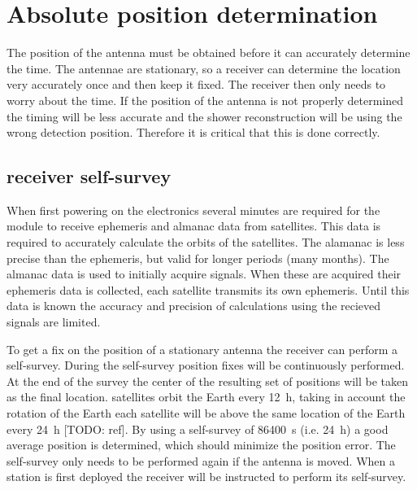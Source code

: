 \section{Absolute position determination}

The position of the \gps antenna must be obtained before it can accurately determine the time. The \gps antennae are stationary, so a \gps receiver can determine the location very accurately once and then keep it fixed. The \gps receiver then only needs to worry about the time. If the position of the \gps antenna is not properly determined the timing will be less accurate and the shower reconstruction will be using the wrong detection position. Therefore it is critical that this is done correctly.


\subsection{\gps receiver self-survey}

When first powering on the electronics several minutes are required for the \gps module to receive ephemeris and almanac data from \gps satellites. This data is required to accurately calculate the orbits of the \gps satellites. The alamanac is less precise than the ephemeris, but valid for longer periods (many months). The almanac data is used to initially acquire \gps signals. When these are acquired their ephemeris data is collected, each \gps satellite transmits its own ephemeris. Until this data is known the accuracy and precision of calculations using the recieved signals are limited.

To get a fix on the position of a stationary \gps antenna the \gps receiver can perform a self-survey. During the self-survey position fixes will be continuously performed. At the end of the survey the center of the resulting set of positions will be taken as the final location. \gps satellites orbit the Earth every \SI{12}{\hour}, taking in account the rotation of the Earth each \gps satellite will be above the same location of the Earth every \SI{24}{\hour} [TODO: ref]. By using a self-survey of \SI{86400}{\second} (i.e. \SI{24}{\hour}) a good average position is determined, which should minimize the position error. The self-survey only needs to be performed again if the \gps antenna is moved. When a \hisparc station is first deployed the \gps receiver will be instructed to perform its self-survey.


